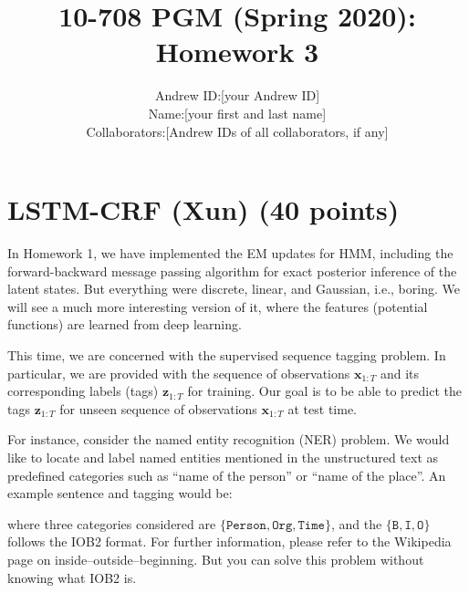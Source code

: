 \documentclass{article}
\title{10-708 PGM (Spring 2020): Homework 3
}
\author{
\begin{tabular}{rl}
Andrew ID: & [your Andrew ID] \\
Name: & [your first and last name] \\
Collaborators: & [Andrew IDs of all collaborators, if any]
\end{tabular}
}
\date{}
\begin{document}
\maketitle



\section{LSTM-CRF (Xun) (40 points)}


\newcommand{\zvec}{\mathbf{z}}
\newcommand{\xvec}{\mathbf{x}}
\newcommand{\ptil}{\tilde{p}}


In Homework 1, we have implemented the EM updates for HMM, including the forward-backward message passing algorithm for exact posterior inference of the latent states. 
But everything were discrete, linear, and Gaussian, i.e., boring.  
We will see a much more interesting version of it, where the features (potential functions) are learned from deep learning. 


This time, we are concerned with the supervised sequence tagging problem. 
In particular, we are provided with the sequence of observations $ \xvec_{1:T} $ and its corresponding labels (tags) $ \zvec_{1:T} $ for training. 
Our goal is to be able to predict the tags $ \zvec_{1:T} $ for unseen sequence of observations $ \xvec_{1:T} $ at test time. 

For instance, consider the named entity recognition (NER) problem. 
We would like to locate and label named entities mentioned in the unstructured text as predefined categories such as ``name of the person'' or ``name of the place''.
An example sentence and tagging would be:
\begin{center}
\end{center}
where three categories considered are $ \{ \texttt{Person}, \texttt{Org}, \texttt{Time} \} $, and the $ \{\texttt{B}, \texttt{I}, \texttt{O} \} $ follows the IOB2 format. 
For further information, please refer to the Wikipedia page on inside–outside–beginning. But you can solve this problem without knowing what IOB2 is.
\end{document}
